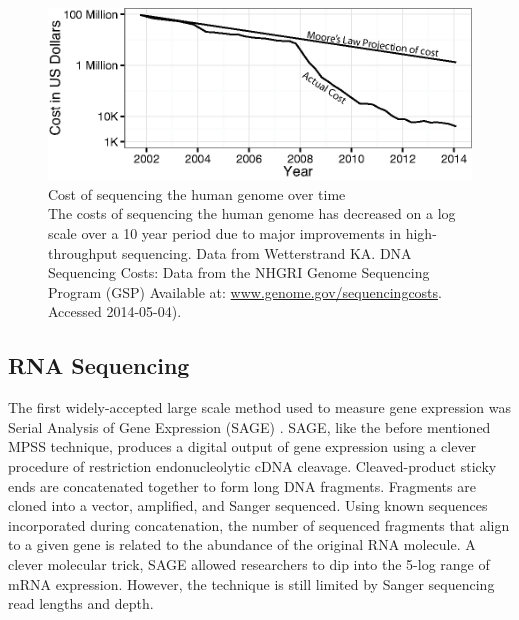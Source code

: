    \begin{figure} %
      \centering
      \includegraphics{Figures/Intro/Sequencing_costs_over_time.eps}
      \caption[Cost of sequencing the human genome over time]
      {
        Cost of sequencing the human genome over time\\[0.25cm]
        The costs of sequencing the human genome has decreased on a log scale over a 10 year period due to major improvements in high-throughput sequencing. Data from Wetterstrand KA. DNA Sequencing Costs: Data from the NHGRI Genome Sequencing Program (GSP) Available at: \url{www.genome.gov/sequencingcosts}. Accessed 2014-05-04).
        }
      \label{Intro:fig:SeqCosts}
      \end{figure}

  \subsection{RNA Sequencing}
    \label{Intro:subsec:Types of HTS}

    The first widely-accepted large scale method used to measure gene expression was Serial Analysis of Gene Expression (SAGE) \citep{Velculescu1995a}. SAGE, like the before mentioned MPSS technique, produces a digital output of gene expression using a clever procedure of restriction endonucleolytic cDNA cleavage. Cleaved-product sticky ends are concatenated together to form long DNA fragments.
    Fragments are cloned into a vector, amplified, and Sanger sequenced. Using known sequences incorporated during concatenation, the number of sequenced fragments that align to a given gene is related to the abundance of the original RNA molecule. A clever molecular trick, SAGE allowed researchers to dip into the 5-log range of mRNA expression. However, the technique is still limited by Sanger sequencing read lengths and depth.

